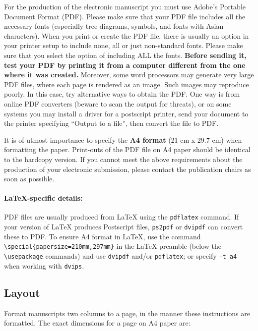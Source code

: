 \documentclass[11pt,a4paper]{article}
\begin{document}
For the production of the electronic manuscript you must use Adobe's Portable Document Format (PDF).
Please make sure that your PDF file includes all the necessary fonts (especially tree diagrams, symbols, and fonts with Asian characters).
When you print or create the PDF file, there is usually an option in your printer setup to include none, all or just non-standard fonts.
Please make sure that you select the option of including ALL the fonts.
\textbf{Before sending it, test your PDF by printing it from a computer different from the one where it was created.}
Moreover, some word processors may generate very large PDF files, where each page is rendered as an image.
Such images may reproduce poorly.
In this case, try alternative ways to obtain the PDF.
One way is from online PDF converters (beware to scan the output for threats), or on some systems you may install a driver for a postscript printer, send your document to the printer specifying ``Output to a file'', then convert the file to PDF.

It is of utmost importance to specify the \textbf{A4 format} (21 cm x 29.7 cm) when formatting the paper.
Print-outs of the PDF file on A4 paper should be identical to the hardcopy version.
If you cannot meet the above requirements about the production of your electronic submission, please contact the publication chairs as soon as possible.

\paragraph{\LaTeX-specific details:}
PDF files are usually produced from \LaTeX{} using the \texttt{\small pdflatex} command.
If your version of \LaTeX{} produces Postscript files, \texttt{\small ps2pdf} or \texttt{\small dvipdf} can convert these to PDF.
To ensure A4 format in \LaTeX, use the command {\small\verb|\special{papersize=210mm,297mm}|}
in the \LaTeX{} preamble (below the {\small\verb|\usepackage|} commands) and use \texttt{\small dvipdf} and/or \texttt{\small pdflatex}; or specify \texttt{\small -t a4} when working with \texttt{\small dvips}.

\subsection{Layout}
\label{ssec:layout}

Format manuscripts two columns to a page, in the manner these
instructions are formatted.
The exact dimensions for a page on A4 paper are:
\end{document}
